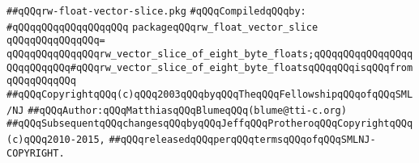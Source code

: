 \label{src/lib/std/rw-float-vector-slice.pkg}
\verb|##qQQqrw-float-vector-slice.pkg|\newline
\newline
\verb|#qQQqCompiledqQQqby:|\newline
\verb|#qQQqqQQqqQQqqQQqqQQq|\newline
\newline
\verb|packageqQQqrw_float_vector_slice|\newline
\verb|qQQqqQQqqQQqqQQq=|\newline
\verb|qQQqqQQqqQQqqQQqrw_vector_slice_of_eight_byte_floats;qQQqqQQqqQQqqQQqqQQqqQQqqQQq#qQQqrw_vector_slice_of_eight_byte_floatsqQQqqQQqisqQQqfromqQQqqQQqqQQq|\newline
\newline
\newline
\verb|##qQQqCopyrightqQQq(c)qQQq2003qQQqbyqQQqTheqQQqFellowshipqQQqofqQQqSML/NJ|\newline
\verb|##qQQqAuthor:qQQqMatthiasqQQqBlumeqQQq(blume@tti-c.org)|\newline
\verb|##qQQqSubsequentqQQqchangesqQQqbyqQQqJeffqQQqProtheroqQQqCopyrightqQQq(c)qQQq2010-2015,|\newline
\verb|##qQQqreleasedqQQqperqQQqtermsqQQqofqQQqSMLNJ-COPYRIGHT.|\newline
\newline

